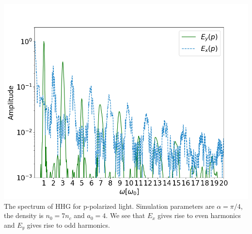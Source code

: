 \documentclass{beamer}
\begin{document}
\begin{frame}
\begin{minipage}[h]{0.48\linewidth}
        \includegraphics[width=1\textwidth, height=0.60\textheight]{images/p_fft.png}
        \scriptsize{The spectrum of HHG for p-polarized light. Simulation parameters are $\alpha = \pi/4$, the density is $n_0 = 7n_c$ and $a_0 = 4$. We see that $E_x$ gives rise to even harmonics and $E_y$ gives rise to odd harmonics.}
        \label{fig:p-peak}
    \end{minipage}


\end{frame}
\end{document}
